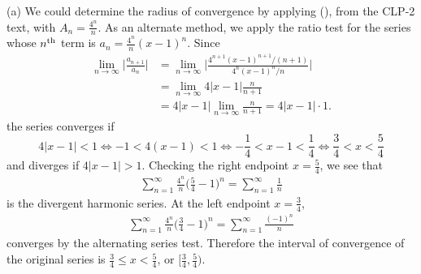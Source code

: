 \begin{solution} (a)
We could determine the radius of convergence by applying (), from the CLP-2 text,
with  $A_n = \frac{4^n}{n}$. As an alternate method, we apply the ratio test for the series 
whose $n^{\rm th}$ term is $a_n= \frac{4^n}{n}(x-1)^n$. Since
\begin{align*}
\lim_{n\to\infty} \bigg| \frac{a_{n+1}}{a_n} \bigg|
&= \lim_{n\to\infty} \bigg| \frac{4^{n+1}(x-1)^{n+1}/(n+1)}{4^n(x-1)^n/n} \bigg| \\
&= \lim_{n\to\infty} 4|x-1| \frac{n}{n+1} \\
&= 4|x-1| \lim_{n\to\infty} \frac{n}{n+1} = 4|x-1|\cdot1.
\end{align*}
the series converges if
\begin{equation*}
4|x-1|<1
\iff -1<4(x-1)<1
\iff -\frac{1}{4}<x-1<\frac{1}{4}
\iff \frac{3}{4}<x<\frac{5}{4}
\end{equation*}
and diverges if $4|x-1|>1$.
Checking the right endpoint $x=\frac{5}{4}$, we see that
\begin{align*}
\sum_{n=1}^\infty \frac{4^n}{n}\bigg( \frac{5}{4}-1 \bigg)^n
= \sum_{n=1}^\infty \frac{1}{n}
\end{align*}
is the divergent harmonic series. At the left endpoint $x=\frac{3}{4}$,
\begin{align*}
\sum_{n=1}^\infty \frac{4^n}{n}\bigg( \frac34-1 \bigg)^n = \sum_{n=1}^\infty \frac{(-1)^n}{n}
\end{align*}
converges by the alternating series test. Therefore the interval of convergence of the
original series is $\frac{3}{4}\le x<\frac{5}{4}$, or $\big[\frac{3}{4},\frac{5}{4}\big)$.


\end{solution}
